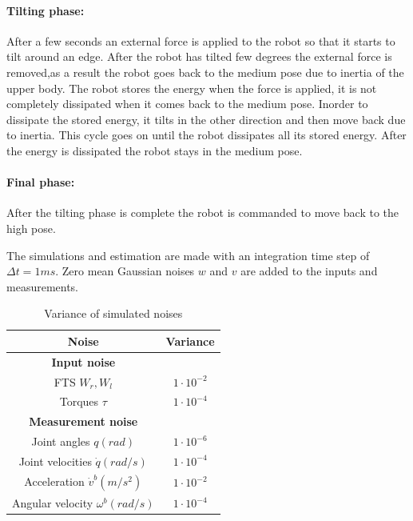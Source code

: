 \paragraph{Tilting phase:} After a few seconds an external force is applied to the robot so that it starts to tilt around an edge. After the robot has tilted few degrees the external force is removed,as a result the robot goes back to the medium pose due to inertia of the upper body. The robot stores the energy when the force is applied, it is not completely dissipated when it comes back to the medium pose. Inorder to dissipate the stored energy, it tilts in the other direction and then move back due to inertia. This cycle goes on until the robot dissipates all its stored energy. After the energy is dissipated the robot stays in the medium pose.
\paragraph{Final phase:} After the tilting phase is complete the robot is commanded to move back to the high pose.

The simulations and estimation are made with an integration time step of $\Delta t=1ms$. Zero mean Gaussian noises $w$ and $v$ are added to the inputs and measurements.
\begin{table}[H]
    \centering
    \begin{tabular}{|c|c|}
    \hline
    Noise &Variance \\ \hline
    \textbf{Input noise} &\hspace{2mm}\\
    FTS $W_r,W_l$ & $1 \cdot {10}^{-2}$ \\ 
    Torques $\tau$ & $1 \cdot {10}^{-4}$\\    \hline
    \textbf{Measurement noise} &\hspace{2mm}\\
    Joint angles $q(rad)$ &$1\cdot{10}^{-6}$ \\ 
    Joint velocities $\dot q(rad/s)$ &$1\cdot{10}^{-4}$ \\
    Acceleration $\dot v^b(m/s^2)$ &$1\cdot{10}^{-2}$ \\ 
    Angular velocity $\omega^b(rad/s)$ &$1\cdot{10}^{-4}$ \\ \hline
    \end{tabular}
    \caption{Variance of simulated noises}
    \label{tab:toro_var}
\end{table}

